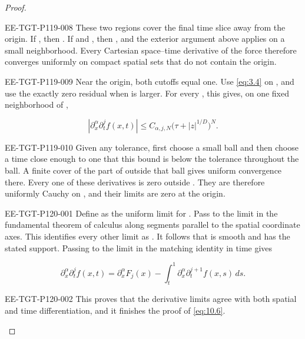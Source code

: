 \begin{proof}
\begin{EESegment}{EE-TGT-P119-008}
These two regions cover the final time slice away from the origin. If
, then . If
 and , then
, and the exterior argument above applies on a small neighborhood.
Every Cartesian space--time derivative of the force therefore converges uniformly on compact
spatial sets that do not contain the origin.
\end{EESegment}

\begin{EESegment}{EE-TGT-P119-009}
Near the origin, both cutoffs equal one. Use \eqref{eq:3.4} on
, and use the exactly zero residual when
 is larger. For every
, this gives, on one fixed neighborhood of
,
\end{EESegment}
\begin{equation}
|\partial_x^\alpha\partial_t^jf(x,t)|
\leq C_{\alpha,j,N}\bigl(\tau+|z|^{1/D}\bigr)^N.
\tag{10.9}\label{eq:10.9}
\end{equation}
\begin{EESegment}{EE-TGT-P119-010}
Given any tolerance, first choose a small ball and then choose a time close enough to one that this
bound is below the tolerance throughout the ball. A finite cover of the part of
 outside that ball gives uniform convergence there. Every one of
these derivatives is zero outside . They are therefore uniformly
Cauchy on , and their limits are zero at the origin.
\end{EESegment}
%
\begin{EESegment}{EE-TGT-P120-001}
Define  as the uniform limit for
. Pass to the limit in the fundamental theorem of calculus along
segments parallel to the spatial coordinate axes. This identifies every other limit as
. It follows that
 is smooth and has the stated support. Passing to the limit in the
matching identity in time gives
\end{EESegment}
\begin{equation}
\partial_x^\alpha\partial_t^jf(x,t)
=\partial_x^\alpha F_j(x)-\int_t^1\partial_x^\alpha\partial_t^{j+1}f(x,s)\,ds.
\tag{10.10}\label{eq:10.10}
\end{equation}
\begin{EESegment}{EE-TGT-P120-002}
This proves that the derivative limits agree with both spatial and time differentiation, and it
finishes the proof of \eqref{eq:10.6}.
\end{EESegment}
\end{proof}

